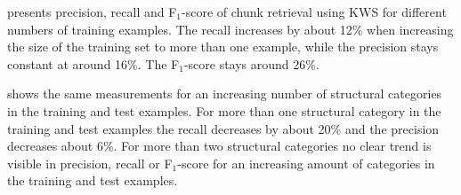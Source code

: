  presents precision,
recall and F$_{1}$-score of chunk retrieval using KWS for different
numbers of training examples.
The recall increases by about 12\% when
increasing the size of the training set to more than one example,
while the precision stays constant at around 16\%.
The F$_{1}$-score
stays around 26\%.

 shows the same
measurements for an increasing number of structural categories in the
training and test examples.
For more than one structural category in
the training and test examples the recall decreases by about 20\% and
the precision decreases about 6\%.
For more than two structural
categories no clear trend is visible in precision, recall or
F$_{1}$-score for an increasing amount of categories in the training
and test examples.



